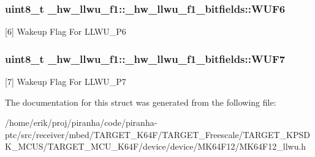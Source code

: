 \subsubsection[{\texorpdfstring{W\+U\+F6}{WUF6}}]{\setlength{\rightskip}{0pt plus 5cm}uint8\+\_\+t \+\_\+hw\+\_\+llwu\+\_\+f1\+::\+\_\+hw\+\_\+llwu\+\_\+f1\+\_\+bitfields\+::\+W\+U\+F6}\hypertarget{struct__hw__llwu__f1_1_1__hw__llwu__f1__bitfields_a6f2adcae900115eb57f01b08b8662b3f}{}\label{struct__hw__llwu__f1_1_1__hw__llwu__f1__bitfields_a6f2adcae900115eb57f01b08b8662b3f}
\mbox{[}6\mbox{]} Wakeup Flag For L\+L\+W\+U\+\_\+\+P6 
\subsubsection[{\texorpdfstring{W\+U\+F7}{WUF7}}]{\setlength{\rightskip}{0pt plus 5cm}uint8\+\_\+t \+\_\+hw\+\_\+llwu\+\_\+f1\+::\+\_\+hw\+\_\+llwu\+\_\+f1\+\_\+bitfields\+::\+W\+U\+F7}\hypertarget{struct__hw__llwu__f1_1_1__hw__llwu__f1__bitfields_a820a54fd12d8150cc533d4ba28a0a5d0}{}\label{struct__hw__llwu__f1_1_1__hw__llwu__f1__bitfields_a820a54fd12d8150cc533d4ba28a0a5d0}
\mbox{[}7\mbox{]} Wakeup Flag For L\+L\+W\+U\+\_\+\+P7 

The documentation for this struct was generated from the following file\+:\begin{DoxyCompactItemize}
\item 
/home/erik/proj/piranha/code/piranha-\/ptc/src/receiver/mbed/\+T\+A\+R\+G\+E\+T\+\_\+\+K64\+F/\+T\+A\+R\+G\+E\+T\+\_\+\+Freescale/\+T\+A\+R\+G\+E\+T\+\_\+\+K\+P\+S\+D\+K\+\_\+\+M\+C\+U\+S/\+T\+A\+R\+G\+E\+T\+\_\+\+M\+C\+U\+\_\+\+K64\+F/device/device/\+M\+K64\+F12/M\+K64\+F12\+\_\+llwu.\+h\end{DoxyCompactItemize}
